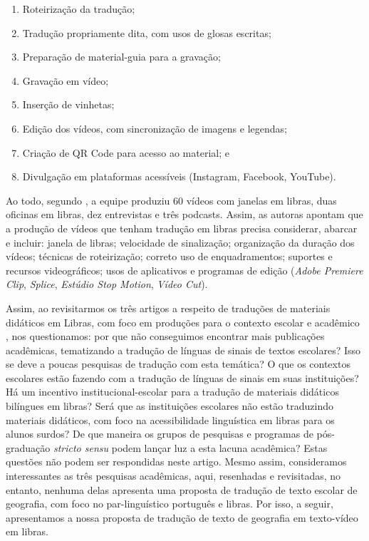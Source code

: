 \documentclass[portuguese]{textolivre}
\begin{document}
\begin{enumerate}[label=\alph*.]
    \item Roteirização da tradução; 
    \item Tradução propriamente dita, com usos de glosas escritas; 
    \item Preparação de material-guia para a gravação; 
    \item Gravação em vídeo; 
    \item Inserção de vinhetas; 
    \item Edição dos vídeos, com sincronização de imagens e legendas; 
    \item Criação de QR Code para acesso ao material; e 
    \item Divulgação em plataformas acessíveis (Instagram, Facebook, YouTube).
\end{enumerate}  

Ao todo, segundo \textcite{baalbaki2024acessibilidade}, a equipe produziu 60 vídeos com janelas em libras, duas oficinas em libras, dez entrevistas e três podcasts. Assim, as autoras apontam que a produção de vídeos que tenham tradução em libras precisa considerar, abarcar e incluir: janela de libras; velocidade de sinalização; organização da duração dos vídeos; técnicas de roteirização; correto uso de enquadramentos; suportes e recursos videográficos; usos de aplicativos e programas de edição (\textit{Adobe Premiere Clip}, \textit{Splice}, \textit{Estúdio Stop Motion}, \textit{Vídeo Cut}).

Assim, ao revisitarmos os três artigos a respeito de traduções de materiais didáticos em Libras, com foco em produções para o contexto escolar e acadêmico \cite{galasso2018materiais,silva2020materiais,baalbaki2024acessibilidade}, nos questionamos: por que não conseguimos encontrar mais publicações acadêmicas, tematizando a tradução de línguas de sinais de textos escolares? Isso se deve a poucas pesquisas de tradução com esta temática? O que os contextos escolares estão fazendo com a tradução de línguas de sinais em suas instituições? Há um incentivo institucional-escolar para a tradução de materiais didáticos bilíngues em libras? Será que as instituições escolares não estão traduzindo materiais didáticos, com foco na acessibilidade linguística em libras para os alunos surdos? De que maneira os grupos de pesquisas e programas de pós-graduação \textit{stricto sensu} podem lançar luz a esta lacuna acadêmica? Estas questões não podem ser respondidas neste artigo. Mesmo assim, consideramos interessantes as três pesquisas acadêmicas, aqui, resenhadas e revisitadas, no entanto, nenhuma delas apresenta uma proposta de tradução de texto escolar de geografia, com foco no par-linguístico português e libras. Por isso, a seguir, apresentamos a nossa proposta de tradução de texto de geografia em texto-vídeo em libras.
\end{document}
